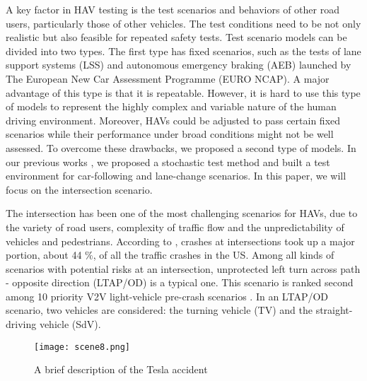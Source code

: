\documentclass[letterpaper, 10 pt, conference]{ieeeconf}
\begin{document}
A key factor in HAV testing is the test scenarios and behaviors of other road users, particularly those of other vehicles. The test conditions need to be not only realistic but also feasible for repeated safety tests. Test scenario models can be divided into two types. The first type has fixed scenarios, such as the tests of lane support systems (LSS) \cite{NCAP2015} and autonomous emergency braking (AEB) \cite{NCAP2015a} launched by The European New Car Assessment Programme (EURO NCAP). A major advantage of this type is that it is repeatable. However, it is hard to use this type of models to represent the highly complex and variable nature of the human driving environment. Moreover, HAVs could be adjusted to pass certain fixed scenarios while their performance under broad conditions might not be well assessed. To overcome these drawbacks, we proposed a second type of models. In our previous works  \cite{Zhao2016m,Zhao2016n,Huang2016UsingScenario}, we proposed a stochastic test method and built a test environment for car-following and lane-change scenarios. In this paper, we will focus on the intersection scenario.
% 
% 

The intersection has been one of the most challenging scenarios for HAVs, due to the variety of road users, complexity of traffic flow and the unpredictability of vehicles and pedestrians. According to \cite{Chan2006b}, crashes at intersections took up a major portion, about 44 $\%$, of all the traffic crashes in the US. Among all kinds of scenarios with potential risks at an intersection, unprotected left turn across path - opposite direction (LTAP/OD) is a typical one. This scenario is ranked second among 10 priority V2V light-vehicle pre-crash scenarios \cite{WassimG.NajmSamuelToma2013a}.
In an LTAP/OD scenario, two vehicles are considered: the turning vehicle (TV) and the straight-driving vehicle (SdV).
    \begin{figure}[t]
          \texttt{[image: scene8.png]}
          \centering
          \caption{A brief description of the Tesla accident}
          \label{fig:LTAPOD}
    \end{figure}
    
\end{document}
